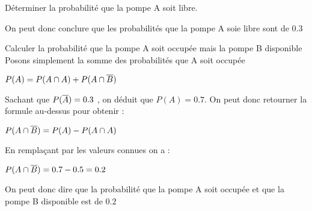 \begin{exo}
\begin{subexo}{Déterminer la probabilité que la pompe A soit libre.}
\begin{center}
  \end{center}
  On peut donc conclure que les probabilités que la pompe A soie libre sont de 0.3
\end{subexo}
\begin{subexo}{Calculer la probabilité que la pompe A soit occupée mais la pompe B disponible}
  Posons simplement la somme des probabilités que A soit occupée
  \begin{center}
    $P(A) = P(A \cap A) + P(A \cap \overline{B})$
  \end{center}
  Sachant que $P(\overline{A}) = 0.3$ , on déduit que $P(A) = 0.7$. On peut donc retourner la formule au-dessus pour obtenir :
  \begin{center}
    $P(A \cap \overline{B}) = P(A) - P(A \cap A)$
  \end{center}
En remplaçant par les valeurs connues on a :
\begin{center}
  $P(A \cap \overline{B}) = 0.7 - 0.5 = 0.2$
\end{center}
On peut donc dire que la probabilité que la pompe A soit occupée et que la pompe B disponible est de $0.2$
\end{subexo}
\end{exo}
